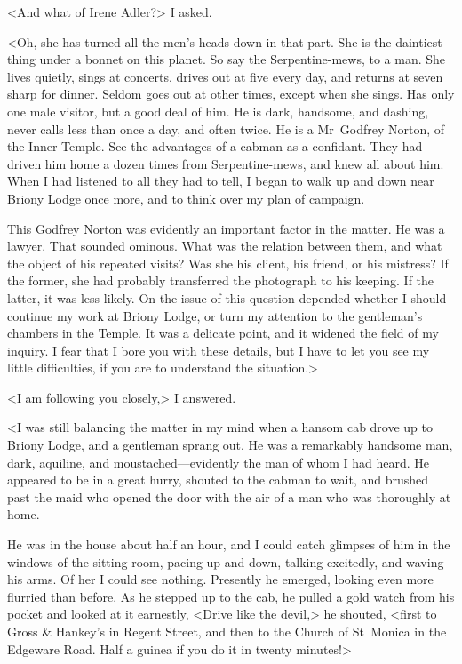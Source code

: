 <And what of Irene Adler?> I asked.

<Oh, she has turned all the men's heads down in that part. She is the daintiest thing under a bonnet on this planet. So say the Serpentine-mews, to a man. She lives quietly, sings at concerts, drives out at five every day, and returns at seven sharp for dinner. Seldom goes out at other times, except when she sings. Has only one male visitor, but a good deal of him. He is dark, handsome, and dashing, never calls less than once a day, and often twice. He is a Mr~Godfrey Norton, of the Inner Temple. See the advantages of a cabman as a confidant. They had driven him home a dozen times from Serpentine-mews, and knew all about him. When I had listened to all they had to tell, I began to walk up and down near Briony Lodge once more, and to think over my plan of campaign.

This Godfrey Norton was evidently an important factor in the matter. He was a lawyer. That sounded ominous. What was the relation between them, and what the object of his repeated visits? Was she his client, his friend, or his mistress? If the former, she had probably transferred the photograph to his keeping. If the latter, it was less likely. On the issue of this question depended whether I should continue my work at Briony Lodge, or turn my attention to the gentleman's chambers in the Temple. It was a delicate point, and it widened the field of my inquiry. I fear that I bore you with these details, but I have to let you see my little difficulties, if you are to understand the situation.>

<I am following you closely,> I answered.

<I was still balancing the matter in my mind when a hansom cab drove up to Briony Lodge, and a gentleman sprang out. He was a remarkably handsome man, dark, aquiline, and moustached—evidently the man of whom I had heard. He appeared to be in a great hurry, shouted to the cabman to wait, and brushed past the maid who opened the door with the air of a man who was thoroughly at home.

He was in the house about half an hour, and I could catch glimpses of him in the windows of the sitting-room, pacing up and down, talking excitedly, and waving his arms. Of her I could see nothing. Presently he emerged, looking even more flurried than before. As he stepped up to the cab, he pulled a gold watch from his pocket and looked at it earnestly, <Drive like the devil,> he shouted, <first to Gross \& Hankey's in Regent Street, and then to the Church of St~Monica in the Edgeware Road. Half a guinea if you do it in twenty minutes!>

